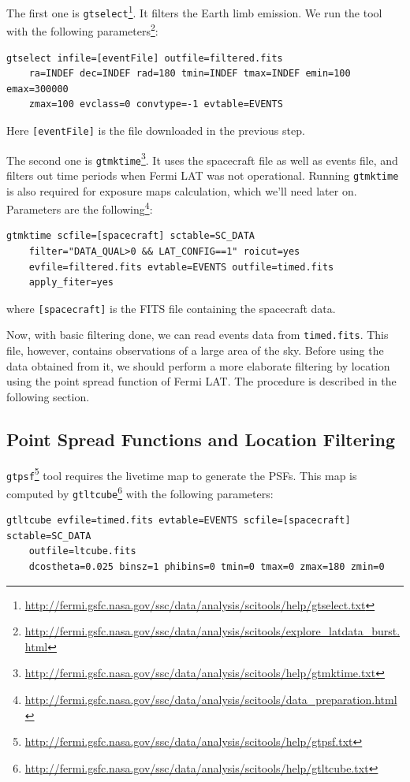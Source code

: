\documentclass{article}
\begin{document}
The first one is \texttt{gtselect}\footnote{\url{http://fermi.gsfc.nasa.gov/ssc/data/analysis/scitools/help/gtselect.txt}}.
It filters the Earth limb emission.
We run the tool with the following parameters\footnote{\url{http://fermi.gsfc.nasa.gov/ssc/data/analysis/scitools/explore_latdata_burst.html}}:
\begin{lstlisting}
gtselect infile=[eventFile] outfile=filtered.fits
	ra=INDEF dec=INDEF rad=180 tmin=INDEF tmax=INDEF emin=100 emax=300000
	zmax=100 evclass=0 convtype=-1 evtable=EVENTS
\end{lstlisting}
Here \texttt{[eventFile]} is the file downloaded in the previous step.

The second one is \texttt{gtmktime}\footnote{\url{http://fermi.gsfc.nasa.gov/ssc/data/analysis/scitools/help/gtmktime.txt}}. It uses the spacecraft file as well as events file, and filters out time periods when Fermi LAT was not operational. Running \texttt{gtmktime} is also required for exposure maps calculation, which we'll need later on. Parameters are the following\footnote{\url{http://fermi.gsfc.nasa.gov/ssc/data/analysis/scitools/data_preparation.html}}:
\begin{lstlisting}
gtmktime scfile=[spacecraft] sctable=SC_DATA
	filter="DATA_QUAL>0 && LAT_CONFIG==1" roicut=yes
	evfile=filtered.fits evtable=EVENTS outfile=timed.fits
	apply_fiter=yes
\end{lstlisting}
where \texttt{[spacecraft]} is the FITS file containing the spacecraft data.

Now, with basic filtering done, we can read events data from \texttt{timed.fits}. This file, however, contains observations of a large area of the sky. Before using the data obtained from it, we should perform a more elaborate filtering by location using the point spread function of Fermi LAT. The procedure is described in the following section.

\subsection{Point Spread Functions and Location Filtering}

\texttt{gtpsf}\footnote{\url{http://fermi.gsfc.nasa.gov/ssc/data/analysis/scitools/help/gtpsf.txt}} tool requires the livetime map to generate the PSFs. This map is computed by \texttt{gtltcube}\footnote{\url{http://fermi.gsfc.nasa.gov/ssc/data/analysis/scitools/help/gtltcube.txt}} with the following parameters:
\begin{lstlisting}
gtltcube evfile=timed.fits evtable=EVENTS scfile=[spacecraft] sctable=SC_DATA
	outfile=ltcube.fits
	dcostheta=0.025 binsz=1 phibins=0 tmin=0 tmax=0 zmax=180 zmin=0
\end{lstlisting}
\end{document}
